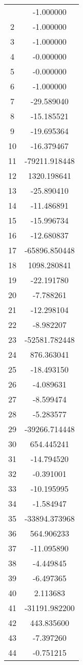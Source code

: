 \documentclass[12pt]{article}
\begin{document}
\begin{longtable}{@{}cc@{}}
\bottomrule
\endlastfoot
1 & -1.000000 \\
2 & -1.000000 \\
3 & -1.000000 \\
4 & -0.000000 \\
5 & -0.000000 \\
6 & -1.000000 \\
7 & -29.589040 \\
8 & -15.185521 \\
9 & -19.695364 \\
10 & -16.379467 \\
11 & -79211.918448 \\
12 & 1320.198641 \\
13 & -25.890410 \\
14 & -11.486891 \\
15 & -15.996734 \\
16 & -12.680837 \\
17 & -65896.850448 \\
18 & 1098.280841 \\
19 & -22.191780 \\
20 & -7.788261 \\
21 & -12.298104 \\
22 & -8.982207 \\
23 & -52581.782448 \\
24 & 876.363041 \\
25 & -18.493150 \\
26 & -4.089631 \\
27 & -8.599474 \\
28 & -5.283577 \\
29 & -39266.714448 \\
30 & 654.445241 \\
31 & -14.794520 \\
32 & -0.391001 \\
33 & -10.195995 \\
34 & -1.584947 \\
35 & -33894.373968 \\
36 & 564.906233 \\
37 & -11.095890 \\
38 & -4.449845 \\
39 & -6.497365 \\
40 & 2.113683 \\
41 & -31191.982200 \\
42 & 443.835600 \\
43 & -7.397260 \\
44 & -0.751215 \\

\end{longtable}
\end{document}
